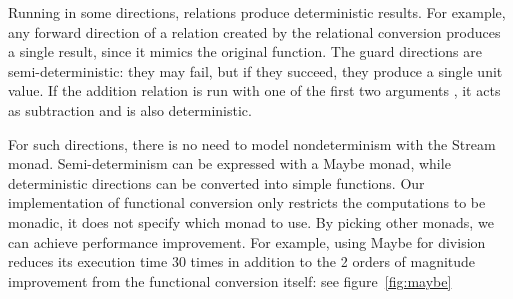 Running in some directions, relations produce deterministic results.
For example, any forward direction of a relation created by the relational conversion produces a single result, since it mimics the original function.
The guard directions are semi-deterministic: they may fail, but if they succeed, they produce a single unit value.
If the addition relation is run with one of the first two arguments \outm, it acts as subtraction and is also deterministic.

For such directions, there is no need to model nondeterminism with the Stream monad.
Semi-determinism can be expressed with a Maybe monad, while deterministic directions can be converted into simple functions.
Our implementation of functional conversion only restricts the computations to be monadic, it does not specify which monad to use.
By picking other monads, we can achieve performance improvement. 
For example, using Maybe for division reduces its execution time $30$ times in addition to the 2 orders of magnitude improvement from the functional conversion itself: see figure~\ref{fig:maybe}

